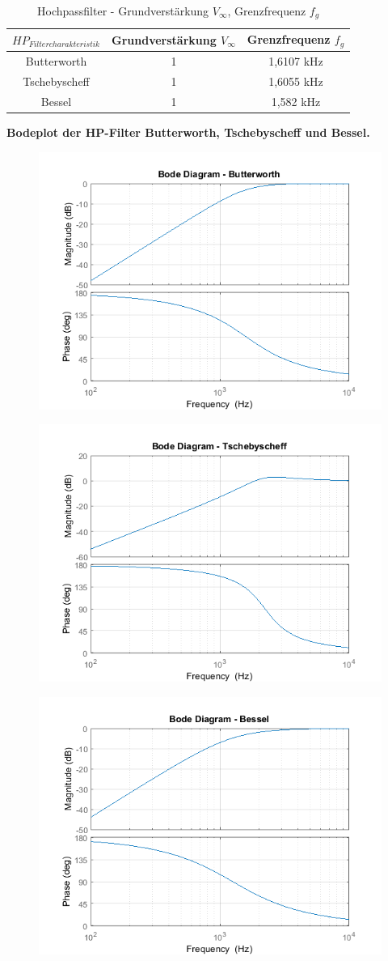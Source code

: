\newpage

\begin{table}[h]
	\centering
	\begin{tabular}{c|c|c}
		$HP_{Filtercharakteristik}$ & Grundverstärkung $V_{\infty}$	& Grenzfrequenz $f_{g}$	\\
		\hline
		\hline
		Butterworth	& 1	& 1,6107 kHz	\\
		Tschebyscheff	& 1	& 1,6055 kHz	\\
		Bessel	& 1	& 1,582 kHz 	\\
	\end{tabular}
	\caption{Hochpassfilter - Grundverstärkung $V_{\infty}$, Grenzfrequenz $f_{g}$ }
	\label{tab:Hochpaesse_Grundverstaerkung}
\end{table}

\textbf{Bodeplot der HP-Filter Butterworth, Tschebyscheff und Bessel.}

\begin{figure}[h]
	\centering
	\includegraphics[width=0.3\linewidth]{Bilder/HP_Butterworth}
	\caption{}
	\label{fig:HP_Butterworth}
\end{figure}

\begin{figure}[h]
	\centering
	\includegraphics[width=0.3\linewidth]{Bilder/HP_Tschebyscheff}
	\caption{}
	\label{fig:HP_Tschebyscheff}
\end{figure}

\begin{figure}[h]
	\centering
	\includegraphics[width=0.3\linewidth]{Bilder/HP_Bessel}
	\caption{}
	\label{fig:HP_Bessel}
\end{figure}
